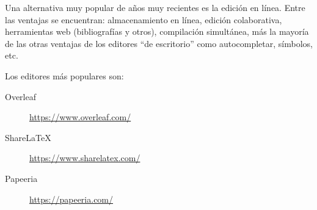 Una alternativa muy popular de años muy recientes es la edición en línea. Entre las ventajas se encuentran: almacenamiento en línea, edición colaborativa, herramientas web (bibliografías y otros), compilación simultánea, más la mayoría de las otras ventajas de los editores ``de escritorio'' como autocompletar, símbolos, etc.

Los editores más populares son:

\begin{description}
\item[Overleaf] \url{https://www.overleaf.com/}
\item[ShareLaTeX] \url{https://www.sharelatex.com/}
\item[Papeeria] \url{https://papeeria.com/}
\end{description}